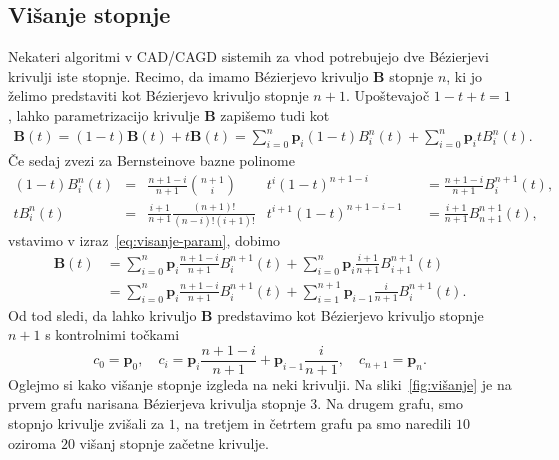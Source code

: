 \documentclass[isrm2, tisk]{fmfdelo}
\newcommand{\p}{\mathbf{p}}
\newcommand{\B}{\mathbf{B}}
\begin{document}
    \subsection{Višanje stopnje}
    Nekateri algoritmi v CAD/CAGD sistemih za vhod potrebujejo dve Bézierjevi krivulji iste stopnje.
    Recimo, da imamo Bézierjevo krivuljo $\B$ stopnje $n$, ki jo želimo predstaviti kot Bézierjevo krivuljo stopnje $n+1$.
    Upoštevajoč $1-t+t=1$, lahko parametrizacijo krivulje $\B$ zapišemo tudi kot
    \begin{align}
        \B(t) = (1-t)\B(t)+t\B(t) = \sum_{i=0}^{n}\mathbf{p}_{i}(1-t)B_i^n(t) +\sum_{i=0}^{n}\mathbf{p}_{i}tB_i^n(t). \label{eq:visanje-param}
    \end{align}
    Če sedaj zvezi za Bernsteinove bazne polinome
    \begin{align*}
    (1-t)
        B_i^n(t) &= & \frac{n+1-i}{n+1} \binom{n+1}{i}&t^i(1-t)^{n+1-i} & &=\frac{n+1-i}{n+1}B_{i}^{n+1}(t), \\
        tB_i^n(t) &= & \frac{i+1}{n+1}\frac{(n+1)!}{(n-i)!(i+1)!}&t^{i+1}(1-t)^{n+1-i-1} & &= \frac{i+1}{n+1}B_{n+1}^{n+1}(t),
    \end{align*}
    vstavimo v izraz~\ref{eq:visanje-param}, dobimo
    \begin{align*}
        \B(t) &= \sum_{i=0}^{n}\mathbf{p}_{i}\frac{n+1-i}{n+1}B_{i}^{n+1}(t) +\sum_{i=0}^{n}\mathbf{p}_{i}\frac{i+1}{n+1}B_{i+1}^{n+1}(t)\\
        &= \sum_{i=0}^{n}\mathbf{p}_{i}\frac{n+1-i}{n+1}B_{i}^{n+1}(t) +\sum_{i=1}^{n+1}\mathbf{p}_{i-1}\frac{i}{n+1}B_{i}^{n+1}(t).
    \end{align*}
    Od tod sledi, da lahko krivuljo $\B$ predstavimo kot Bézierjevo krivuljo stopnje $n+1$ s kontrolnimi točkami \[c_0=\p_0, \quad c_i=\mathbf{p}_{i}\frac{n+1-i}{n+1} + \mathbf{p}_{i-1}\frac{i}{n+1},\quad c_{n+1}=\p_n. \]
    Oglejmo si kako višanje stopnje izgleda na neki krivulji.
    Na sliki~\ref{fig:višanje} je na prvem grafu narisana Bézierjeva krivulja stopnje $3$.
    Na drugem grafu, smo stopnjo krivulje zvišali za $1$, na tretjem in četrtem grafu pa smo naredili $10$ oziroma $20$ višanj stopnje začetne krivulje.
\end{document}
